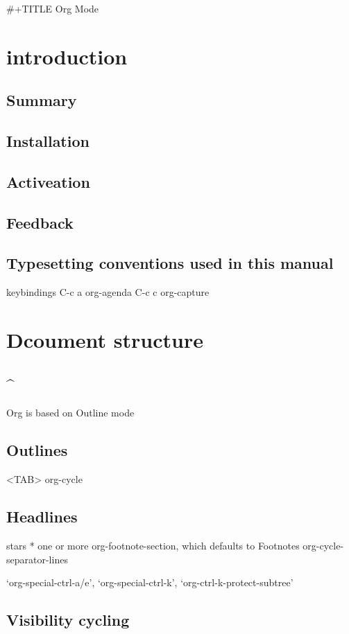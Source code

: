 \documentclass[11pt]{article}
\author{nicolas4d}
\date{\today}
\title{}
\begin{document}
\tableofcontents

\#+TITLE Org Mode
\section{introduction}
\label{sec:org2054775}
\subsection{Summary}
\label{sec:orge830729}
\subsection{Installation}
\label{sec:org53aa450}
\subsection{Activeation}
\label{sec:org4de31b9}
\subsection{Feedback}
\label{sec:org702cfdd}
\subsection{Typesetting conventions used in this manual}
\label{sec:org0836ecf}
keybindings
C-c a org-agenda
C-c c org-capture
\section{Dcoument structure}
\label{sec:orgd12febb}
\subsection{\^{}}
\label{sec:org797529e}
Org is based on Outline mode
\subsection{Outlines}
\label{sec:orge0eea1a}
<TAB>  org-cycle
\subsection{Headlines}
\label{sec:orge5cce70}
stars * one or more
org-footnote-section, which defaults to Footnotes
org-cycle-separator-lines

‘org-special-ctrl-a/e’, ‘org-special-ctrl-k’, ‘org-ctrl-k-protect-subtree’ 
\subsection{Visibility cycling}
\label{sec:org4ce4483}
\end{document}
